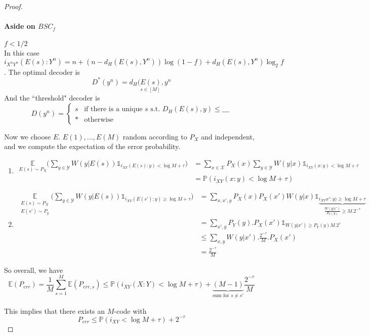 \begin{proof}
\paragraph{Aside on $BSC_f$} $f<1/2$\\
In this case $i_{X^nY^n}(E(s):Y^n)=n+(n-d_H(E(s),Y^n))\log(1-f)+d_H(E(s),Y^n)\log_2 f$.
The optimal decoder is 
\[D^*(y^n)=\underset{s\in [M]}{d_H(E(s),y^n}\]
And the ``threshold" decoder is 
\[D(y^n) = \begin{cases} s & \text{if there is a unique $s$ s.t. $D_H(E(s),y)\leq \_\_\_ $} \\ \ast & \text{otherwise} \end{cases}\]

Now we choose $E$. $E(1),...,E(M)$ random according to $P_X$ and independent, and we compute the expectation of the error probability.

\begin{enumerate}
\item \begin{align*}
\underset{E(s)\sim P_X}{\mathbb{E}} \Big( \sum_{y \in \mathcal{Y}} W(y|E(s)) \mathbb{1}_{i_{XY}(E(s):y)<\log M + \tau} \Big) & = \sum_{x\in \mathcal{X}} P_X(x)\sum_{y\in \mathcal{Y}}W(y|x)\mathbb{1}_{i_{XY}(x:y)<\log M + \tau}\\
&= \mathbb{P}(i_{XY}(x:y)<\log M + \tau)
\end{align*}

\item \begin{align*}
\underset{\substack{E(s)\sim P_X \\ E(s')\sim P_y}}{\mathbb{E}} \Big( \sum_{y\in \mathcal{Y}} W(y|E(s))\mathbb{1}_{i_{XY}(E(s'):y)\geq \log M + \tau} \Big) & = \sum_{x,x',y} P_X(x)P_X(x')W(y|x)\mathbb{1}\underbrace{_{i_{XY}{x':y)\geq \log M + \tau}}}_{\frac{W(y|x')}{P_Y(y)}\geq M.2^{-\tau}}\\
& = \sum_{x',y} P_{Y}(y).P_X(x')\mathbb{1}_{W(y|x')\geq P_Y(y)M.2^\tau}\\
& \leq \sum_{x,y} W(y|x').\frac{2^{-\tau}}{M}.P_{X}(x')\\
& = \frac{2^{-\tau}}{M}
\end{align*}
\end{enumerate}

So overall, we have
\[ \mathbb{E}( P_{err} ) = \frac{1}{M} \sum_{s=1}^{M}\mathbb{E}(P_{err,s})\leq \mathbb{P}(i_{XY}(X:Y)<\log M + \tau) + \underbrace{(M-1)}_{\text{sum for $s\neq s'$}}\frac{2^{-\tau}}{M}\]

This implies that there exists an $M$-code with
\[P_{err}\leq \mathbb{P}(i_{XY}<\log M + \tau) + 2^{-\tau}\]
\end{proof}

